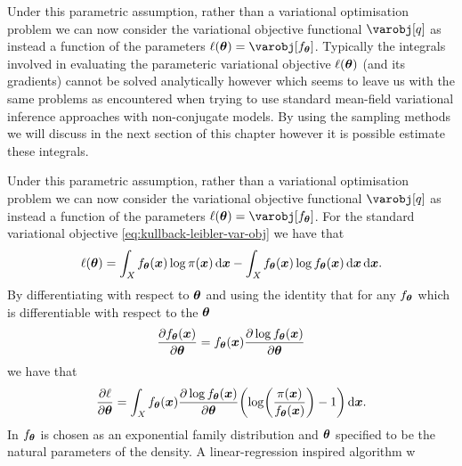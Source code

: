 Under this parametric assumption, rather than a variational optimisation problem we can now consider the variational objective functional $\varobj[q]$ as instead a function of the parameters $\ell(\vct{\theta}) = \varobj[f_{\vct{\theta}}]$. Typically the integrals involved in evaluating the parameteric variational objective $\ell(\boldsymbol{\theta})$ (and its gradients) cannot be solved analytically however which seems to leave us with the same problems as encountered when trying to use standard mean-field variational inference approaches with non-conjugate models. By using the sampling methods we will discuss in the next section of this chapter however it is possible estimate these integrals.

Under this parametric assumption, rather than a variational optimisation problem we can now consider the variational objective functional $\varobj[q]$ as instead a function of the parameters $\ell(\vct{\theta}) = \varobj[f_{\vct{\theta}}]$. For the standard variational objective \eqref{eq:kullback-leibler-var-obj} we have that
\begin{equation}\label{eq:kl-var-obj-parameteric}
  \ell(\boldsymbol{\theta}) = 
  \int_{\mathit{X}} f_{\boldsymbol{\theta}}(\boldsymbol{x}) \log\pi(\boldsymbol{x}) \,\mathrm{d}\boldsymbol{x} -
  \int_{\mathit{X}}  f_{\boldsymbol{\theta}}(\boldsymbol{x}) \log f_{\boldsymbol{\theta}}(\boldsymbol{x})  \,\mathrm{d}\boldsymbol{x}
  \,\mathrm{d}\boldsymbol{x}.
\end{equation}
By differentiating with respect to $\boldsymbol{\theta}$ and using the identity that for any $f_{\boldsymbol{\theta}}$ which is differentiable with respect to the $\boldsymbol{\theta}$
\begin{equation}\label{eq:log-derivative-identity}
  \frac{\partial f_{\boldsymbol{\theta}}(\boldsymbol{x})}{\partial \boldsymbol{\theta}} = 
  f_{\boldsymbol{\theta}}(\boldsymbol{x}) \frac{\partial \log f_{\boldsymbol{\theta}}(\boldsymbol{x})}{\partial \boldsymbol{\theta}}
\end{equation} 
we have that
\begin{equation}\label{eq:kl-var-obj-parameteric-gradient}
  \pd{\ell}{\vct{\theta}} = 
  \int_{\set{X}} f_{\vct{\theta}}(\vct{x}) \pd{\log f_{\vct{\theta}}(\vct{x})}{\vct{\theta}} \lpa \log\lpa \frac{\pi(\vct{x})}{f_{\vct{\theta}}(\vct{x})}\rpa -1 \rpa \,\dr\vct{x}.
\end{equation}
In \cite{salimans2013fixed} $f_{\boldsymbol{\theta}}$ is chosen as an exponential family distribution and $\boldsymbol{\theta}$ specified to be the natural parameters of the density. A linear-regression inspired algorithm w


